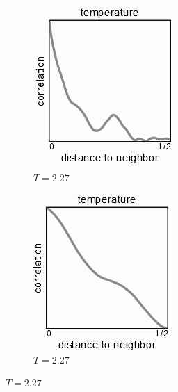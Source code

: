 \documentclass[]{article}
\begin{document}
\begin{figure}[H]
	\caption{Correlation}
	\begin{subfigure}[t]{0.24\textwidth}
		\caption{$T=2.27$}
		\includegraphics[width=\textwidth]{ising-correlation1}
	\end{subfigure}
	\begin{subfigure}[t]{0.24\textwidth}
		\caption{$T=2.27$}
		\includegraphics[width=\textwidth]{ising-correlation2}

\end{subfigure}
\end{figure}
\end{document}
